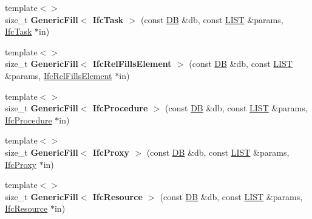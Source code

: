 \begin{DoxyCompactItemize}
\item 
\hypertarget{namespace_assimp_1_1_s_t_e_p_a596b7b7807fbb1655690ceafa4749652}{{\footnotesize template$<$$>$ }\\size\+\_\+t {\bfseries Generic\+Fill$<$ Ifc\+Task $>$} (const \hyperlink{class_assimp_1_1_s_t_e_p_1_1_d_b}{D\+B} \&db, const \hyperlink{class_assimp_1_1_s_t_e_p_1_1_e_x_p_r_e_s_s_1_1_l_i_s_t}{L\+I\+S\+T} \&params, \hyperlink{struct_assimp_1_1_i_f_c_1_1_ifc_task}{Ifc\+Task} $\ast$in)}\label{namespace_assimp_1_1_s_t_e_p_a596b7b7807fbb1655690ceafa4749652}

\item 
\hypertarget{namespace_assimp_1_1_s_t_e_p_a3cff2864d9c2df016601598d282cab2a}{{\footnotesize template$<$$>$ }\\size\+\_\+t {\bfseries Generic\+Fill$<$ Ifc\+Rel\+Fills\+Element $>$} (const \hyperlink{class_assimp_1_1_s_t_e_p_1_1_d_b}{D\+B} \&db, const \hyperlink{class_assimp_1_1_s_t_e_p_1_1_e_x_p_r_e_s_s_1_1_l_i_s_t}{L\+I\+S\+T} \&params, \hyperlink{struct_assimp_1_1_i_f_c_1_1_ifc_rel_fills_element}{Ifc\+Rel\+Fills\+Element} $\ast$in)}\label{namespace_assimp_1_1_s_t_e_p_a3cff2864d9c2df016601598d282cab2a}

\item 
\hypertarget{namespace_assimp_1_1_s_t_e_p_a885fdbe15f059bf4c76b519ff6e79daf}{{\footnotesize template$<$$>$ }\\size\+\_\+t {\bfseries Generic\+Fill$<$ Ifc\+Procedure $>$} (const \hyperlink{class_assimp_1_1_s_t_e_p_1_1_d_b}{D\+B} \&db, const \hyperlink{class_assimp_1_1_s_t_e_p_1_1_e_x_p_r_e_s_s_1_1_l_i_s_t}{L\+I\+S\+T} \&params, \hyperlink{struct_assimp_1_1_i_f_c_1_1_ifc_procedure}{Ifc\+Procedure} $\ast$in)}\label{namespace_assimp_1_1_s_t_e_p_a885fdbe15f059bf4c76b519ff6e79daf}

\item 
\hypertarget{namespace_assimp_1_1_s_t_e_p_a79c1ad77bbb694fec98aa4834e287d2a}{{\footnotesize template$<$$>$ }\\size\+\_\+t {\bfseries Generic\+Fill$<$ Ifc\+Proxy $>$} (const \hyperlink{class_assimp_1_1_s_t_e_p_1_1_d_b}{D\+B} \&db, const \hyperlink{class_assimp_1_1_s_t_e_p_1_1_e_x_p_r_e_s_s_1_1_l_i_s_t}{L\+I\+S\+T} \&params, \hyperlink{struct_assimp_1_1_i_f_c_1_1_ifc_proxy}{Ifc\+Proxy} $\ast$in)}\label{namespace_assimp_1_1_s_t_e_p_a79c1ad77bbb694fec98aa4834e287d2a}

\item 
\hypertarget{namespace_assimp_1_1_s_t_e_p_ad824bbfed8e047c20a9c8389c7709774}{{\footnotesize template$<$$>$ }\\size\+\_\+t {\bfseries Generic\+Fill$<$ Ifc\+Resource $>$} (const \hyperlink{class_assimp_1_1_s_t_e_p_1_1_d_b}{D\+B} \&db, const \hyperlink{class_assimp_1_1_s_t_e_p_1_1_e_x_p_r_e_s_s_1_1_l_i_s_t}{L\+I\+S\+T} \&params, \hyperlink{struct_assimp_1_1_i_f_c_1_1_ifc_resource}{Ifc\+Resource} $\ast$in)}\label{namespace_assimp_1_1_s_t_e_p_ad824bbfed8e047c20a9c8389c7709774}


\end{DoxyCompactItemize}
